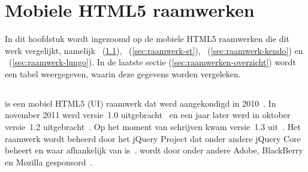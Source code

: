 


% 

\chapter{Mobiele HTML5 raamwerken}
\label{chap:raamwerken}


In dit hoofdstuk wordt ingezoomd op de mobiele HTML5 raamwerken die dit werk vergelijkt, namelijk \jqm{}~(\ref{sec:raamwerk-jqm}), \st{}~(\ref{sec:raamwerk-st}), \kendo{}~(\ref{sec:raamwerk-kendo}) en \lungo{}~(\ref{sec:raamwerk-lungo}).
In de laatste sectie (\ref{sec:raamwerken-overzicht}) wordt een tabel weergegeven, waarin deze gegevens worden vergeleken.

\section{\jqm}
\label{sec:raamwerk-jqm}
\jqm{} is een mobiel HTML5  (UI) raamwerk dat werd aangekondigd in 2010~\cite{Resig2010}. 
In november 2011 werd versie~1.0 uitgebracht~\cite{Parker2011} en een jaar later werd in oktober versie~1.2 uitgebracht~\cite{Parker2012}. 
Op het moment van schrijven kwam versie~1.3 uit~\cite{Parker2013a}. 
Het raamwerk wordt beheerd door het jQuery Project dat onder andere jQuery Core beheert en waar \jqm{} afhankelijk van is~\cite{JQuery2012}. 
\jqm{} wordt door onder andere Adobe, BlackBerry en Mozilla gesponsord~\cite{JQuery2012a}.

